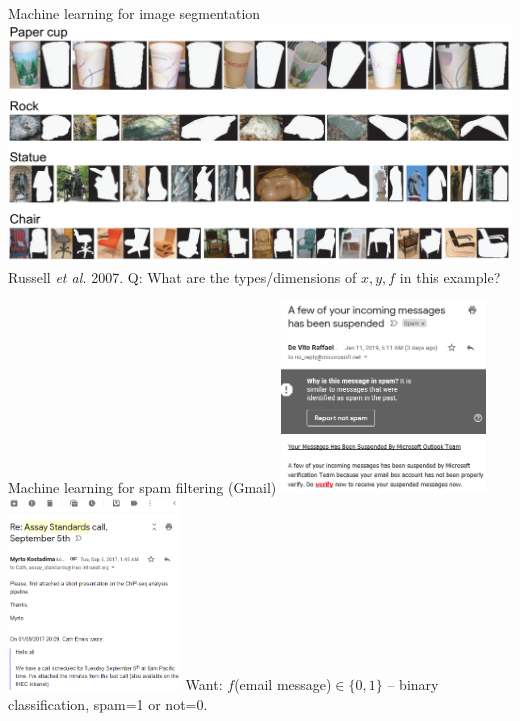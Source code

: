 \documentclass{article}
\begin{document}
{Machine learning for image segmentation}
\includegraphics[width=\textwidth]{image-segmentation/labelme-examples}
Russell {\it et al.} 2007.
Q: What are the types/dimensions of $x,y,f$ in this example?

{Machine learning for spam filtering (Gmail)}
\includegraphics[height=2in]{spam-filtering/screenshot-gmail-spam}
\includegraphics[height=2in]{spam-filtering/screenshot-inbox-message}
Want: $f$(email message)$\in\{0,1\}$ -- binary classification, spam=1
or not=0.
\end{document}
